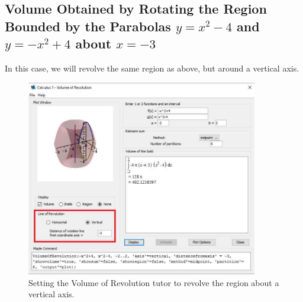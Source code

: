
\begin{maplegroup}
\begin{mapleinput}
\end{mapleinput}
\mapleresult
\begin{maplelatex}
\end{maplelatex}
\end{maplegroup}

\clearpage

\subsection{Volume Obtained by Rotating the Region Bounded by the Parabolas $y=x^2-4$ and $y=-x^2+4$ about $x=-3$}

In this case, we will revolve the same region as above, but around a vertical axis.


\begin{figure}
\caption{Setting the Volume of Revolution tutor to revolve the region about a vertical axis.}
\centering
\includegraphics[width=0.9\textwidth]{tutorials/figures/VoRTutorQ1-2-eps-converted-to.pdf}
\end{figure}

